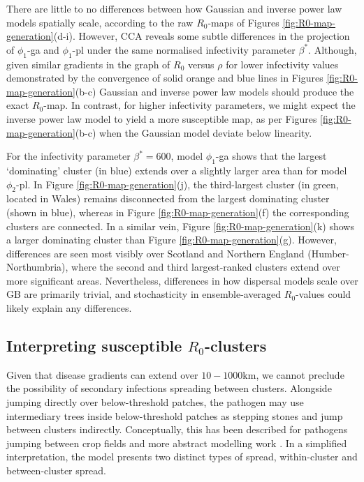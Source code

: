There are little to no differences between how Gaussian and inverse power law models spatially scale, according to the raw $R_0$-maps of Figures \ref{fig:R0-map-generation}(d-i).
However, CCA reveals some subtle differences in the projection of $\phi_1$-ga and $\phi_1$-pl under the same normalised infectivity parameter $\beta^*$.
Although, given similar gradients in the graph of $R_0$ versus $\rho$ for lower infectivity values
\textemdash demonstrated by the convergence of solid orange and blue lines in Figures \ref{fig:R0-map-generation}(b-c)\textemdash 
Gaussian and inverse power law models should produce the exact $R_0$-map.
In contrast, for higher infectivity parameters, we might expect the inverse power law model to yield a more susceptible map, as per Figures \ref{fig:R0-map-generation}(b-c) when the Gaussian model deviate below linearity.

For the infectivity parameter $\beta^*=600$, model $\phi_1$-ga shows that the largest `dominating' cluster (in blue) extends over a slightly larger area than for model $\phi_2$-pl.
In Figure \ref{fig:R0-map-generation}(j), the third-largest cluster (in green, located in Wales) remains disconnected from the largest dominating cluster (shown in blue),
whereas in Figure \ref{fig:R0-map-generation}(f) the corresponding clusters are connected. 
In a similar vein, Figure \ref{fig:R0-map-generation}(k) shows a larger dominating cluster than Figure \ref{fig:R0-map-generation}(g).
However, differences are seen most visibly over Scotland and Northern England (Humber-Northumbria), where the second and third largest-ranked clusters extend over more significant areas.
Nevertheless, differences in how dispersal models scale over GB are primarily trivial, and stochasticity in ensemble-averaged $R_0$-values could likely explain any differences.

\subsection{Interpreting susceptible $R_0$-clusters}

Given that disease gradients can extend over $10-1000\mathrm{km}$, we cannot preclude the possibility of secondary infections spreading between clusters.
Alongside jumping directly over below-threshold patches, the pathogen may use intermediary trees inside below-threshold patches as stepping stones and jump between clusters indirectly. 
Conceptually, this has been described for pathogens jumping between crop fields \cite{Gilligan-disease-management} and more abstract modelling work \cite{wingen2013long}.
In a simplified interpretation, the model presents two distinct types of spread, within-cluster and between-cluster spread. 

